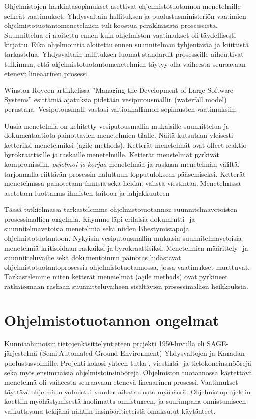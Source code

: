 \documentclass[finnish]{tktltiki2}
\theoremstyle{definition}
\theoremstyle{remark}
\begin{document}
Ohjelmistojen hankintasopimukset asettivat ohjelmistotuotannon menetelmille selkeät vaatimukset. Yhdysvaltain hallituksen ja puolustusministeriön vaatimien ohjelmistotuotantomenetelmien tuli koostua peräkkäisistä prosesseista. Suunnittelua ei aloitettu ennen kuin ohjelmiston vaatimukset oli täydellisesti kirjattu. Eikä ohjelmointia aloitettu ennen suunnitelman tyhjentävää ja kriittistä tarkastelua. Yhdysvaltain hallituksen luomat standardit prosesseille aiheuttivat tulkinnan, että ohjelmistotuotantomenetelmien täytyy olla vaiheesta seuraavaan etenevä lineaarinen prosessi\cite{BOE06}.

Winston Roycen artikkelissa ''Managing the Development of Large Software Systems'' esittämiä ajatuksia pidetään vesiputousmallin (waterfall model) perustana. Vesiputousmalli vastasi valtionhallinnon sopimusten vaatimuksiin\cite{LAB03}.

Uusia menetelmiä on kehitetty vesiputousmallin mukaisille suunnittelua ja dokumentaatiota painottavien menetelmien tilalle. Näitä kutsutaan yleisesti ketteriksi menetelmiksi (agile methods). Ketterät menetelmät ovat olleet reaktio byrokraattisille ja raskaille menetelmille. Ketterät menetelmät pyrkivät kompromissiin, \textit{ohjelmoi ja korjaa}-menetelmän ja raskaan menetelmän väliltä, tarjoamalla riittävän prosessin haluttuun lopputulokseen pääsemiseksi\cite{FOW01a}. Ketterät menetelmissä painotetaan ihmisiä sekä heidän välistä viestintää.  Menetelmissä asetetaan luottamus ihmisten taitoon ja lahjakkuuteen

Tässä tutkielmassa tarkastelemme ohjelmistotuotannon suunnitelmavetoisten prosessimallien ongelmia. Käymme läpi erilaisia dokumentti- ja suunnitelmavetoisia menetelmiä sekä niiden lähestymistapoja ohjelmistotuotantoon. Nykyisin vesiputousmallin mukaisia suunnitelmavetoisia menetelmiä kritisoidaan raskaiksi ja byrokraattisiksi. Menetelmien määrittely- ja suunnitteluvaihe sekä dokumentoinnin painotus hidastavat ohjelmistotuotantoprosessia ohjelmistotuotannossa, jossa vaatimukset muuttuvat\cite{FOW01a}. Tarkastelemme miten ketterät menetelmät (agile methods) ovat pyrkineet ratkaisemaan raskaan suunnitteluvaiheen sisältävien prosessimallien heikkouksia.

\section{Ohjelmistotuotannon ongelmat}

Kunnianhimoisin tietojenkäsittelyntieteen projekti 1950-luvulla oli SAGE-järjestelmä (Semi-Automated Ground Environment) Yhdysvaltojen ja Kanadan puolustusvoimille. Projekti kokosi yhteen tutka-, viestintä- ja tietokoneinsinöörejä sekä myös ensimmäisiä ohjelmistoinsinöörejä. Ohjelmiston tuotannossa käytettävä menetelmä oli vaiheesta seuraavaan etenevä lineaarinen prosessi. Vaatimukset täyttävä ohjelmisto valmistui vuoden aikataulusta myöhässä. Ohjelmistoprojektin koettiin myöhästymisestä huolimatta onnistuneen, ja suurimpana onnistumiseen vaikuttavana tekijänä nähtiin insinööritieteistä omaksutut käytänteet\cite{BOE06}.
\end{document}
